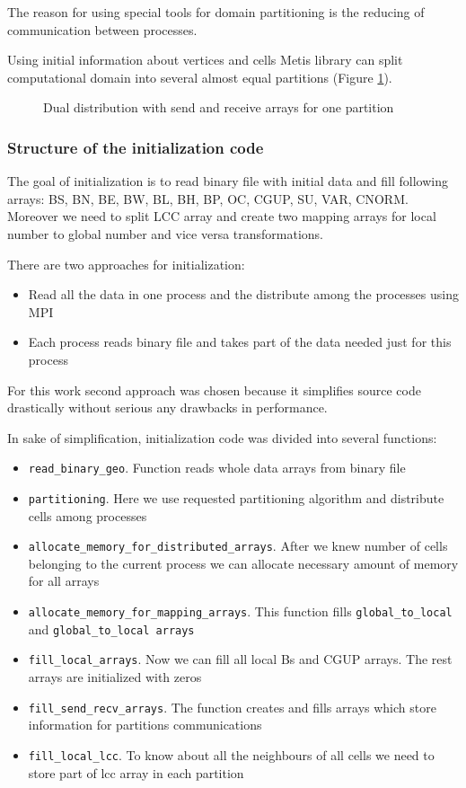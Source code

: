 \documentclass[12pt, a4paper]{article}
\begin{document}
The reason for using special tools for domain partitioning is the
reducing of communication between processes.

Using initial information about vertices and cells Metis library
can split computational domain into several almost equal partitions 
(Figure \ref{fig:Dual}).

\begin{figure}[ht]
	\caption{Dual distribution with send and receive arrays for one partition}
	\label{fig:Dual}
\end{figure}




\subsubsection{Structure of the initialization code}

The goal of initialization is to read binary file with initial data and
fill following arrays: BS, BN, BE, BW, BL, BH, BP, OC, CGUP, SU, VAR, CNORM.
Moreover we need to split LCC array and create two mapping arrays
for local number to global number and vice versa transformations.

There are two approaches for initialization:
\begin{itemize}
	\item Read all the data in one process and the distribute among the processes using MPI
	\item Each process reads binary file and takes part of the data needed just for this process
\end{itemize}

For this work second approach was chosen because it simplifies source code
drastically without serious any drawbacks in performance.

In sake of simplification, initialization code was divided into 
several functions:
\begin{itemize}
	\item \texttt{read\_binary\_geo}. Function reads whole data arrays from binary file
	\item \texttt{partitioning}. Here we use requested partitioning algorithm and distribute cells among processes
	\item \texttt{allocate\_memory\_for\_distributed\_arrays}. After we knew number of cells belonging to the current process we can allocate necessary amount of memory for all arrays
	\item \texttt{allocate\_memory\_for\_mapping\_arrays}. This function fills \texttt{global\_to\_local} and \texttt{global\_to\_local arrays}
	\item \texttt{fill\_local\_arrays}. Now we can fill all local Bs and CGUP arrays. The rest arrays are initialized with zeros
	\item \texttt{fill\_send\_recv\_arrays}. The function creates and fills arrays which store information for partitions communications
	\item \texttt{fill\_local\_lcc}. To know about all the neighbours of all cells we need to store part of lcc array in each partition
\end{itemize}
\end{document}

